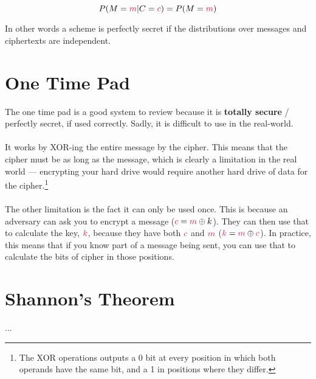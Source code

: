 $$P(M=\cm|C=\cc)=P(M=\cm)$$

In other words a scheme is perfectly secret if the distributions over messages and ciphertexts are independent.

\section{One Time Pad}
The one time pad is a good system to review because it is \textbf{totally secure} / perfectly secret, if used correctly. Sadly, it is difficult to use in the real-world.\\
\\
It works by XOR-ing the entire message by the cipher. This means that the cipher must be as long as the message, which is clearly a limitation in the real world --- encrypting your hard drive would require another hard drive of data for the cipher.\footnote{The XOR operations outputs a 0 bit at every position in which both operands have the same bit, and a 1 in positions where they differ.}\\
\\
The other limitation is the fact it can only be used once. This is because an adversary  can ask you to encrypt a message ($\cc=\cm\oplus k$). They can then use that to calculate the key, $\ck$,  because they have both $\cc$ and $\cm$ ($\ck=\cm\oplus \cc$). In practice, this means that if you know part of a message being sent, you can use that to calculate the bits of cipher in those positions.

\section{Shannon's Theorem}
...